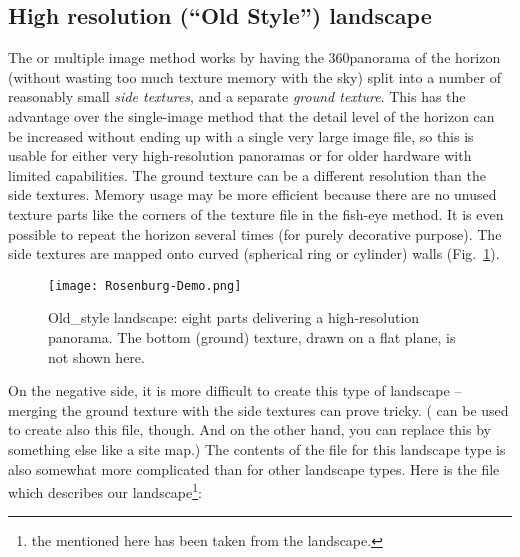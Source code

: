 \subsection{High resolution (``Old Style'')  landscape}
\label{sec:landscapes:oldStyle}

The  or multiple image method works by having the
360\degree panorama of the horizon (without wasting too much texture
memory with the sky) split into a number of reasonably small
\emph{side textures}, and a separate \emph{ground texture}. This has
the advantage over the single-image method that the detail level of
the horizon can be increased without ending up with a single very
large image file, so this is usable for either very high-resolution
panoramas or for older hardware with limited capabilities. The ground
texture can be a different resolution than the side textures. Memory
usage may be more efficient because there are no unused texture parts
like the corners of the texture file in the fish-eye method. It is
even possible to repeat the horizon several times (for purely
decorative purpose). The side textures are mapped onto curved
(spherical ring or cylinder) walls
(Fig.~\ref{fig:landscapes:oldStyle}).

\begin{figure}[tb]
  \centering
   \texttt{[image: Rosenburg-Demo.png]}
   \caption{Old\_style landscape: eight parts delivering a
     high-resolution panorama. The bottom (ground) texture, drawn on a flat
     plane, is not shown here.}
  \label{fig:landscapes:oldStyle}
\end{figure}

On the negative side, it is more difficult to create this type of
landscape -- merging the ground texture with the side textures can
prove tricky. ( can be used to create also this file,
though. And on the other hand, you can replace this by something else
like a site map.) The contents of the  file for
this landscape type is also somewhat more complicated than for other
landscape types. Here is the  file which describes
our  landscape\footnote{the 
   mentioned here has been taken from the
   landscape.}:

